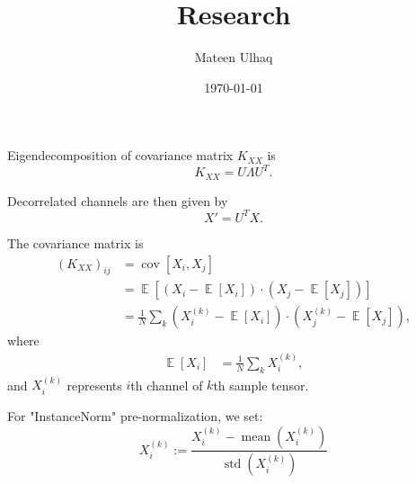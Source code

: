 \documentclass[12pt]{extarticle}
\title{Research}
\author{Mateen Ulhaq}
\date{\today}
\DeclareMathOperator{\cov}{cov}
\DeclareMathOperator{\EV}{\mathbb{E}}
\DeclareMathOperator{\mean}{mean}
\DeclareMathOperator{\std}{std}
\begin{document}
\maketitle

Eigendecomposition of covariance matrix $K_{XX}$ is
\[ K_{XX} = U \Lambda U^T. \]

Decorrelated channels are then given by
\[ X' = U^T X. \]


\bigskip

%

The covariance matrix is
\begin{align*}
  {(K_{XX})}_{ij}
    &= \cov[X_i, X_j] \\
    &= \EV[(X_i - \EV[X_i]) \cdot (X_j - \EV[X_j])] \\
    &= \frac{1}{N} \sum_k {(X_i^{(k)} - \EV[X_i]) \cdot (X_j^{(k)} - \EV[X_j])},
\end{align*}
where
\begin{align*}
  \EV[X_i]
    &= \frac{1}{N} \sum_k X_i^{(k)},
\end{align*}
and $X_i^{(k)}$ represents $i$th channel of $k$th sample tensor.

\bigskip

For "InstanceNorm" pre-normalization, we set:
\[ X_i^{(k)} := \frac{X_i^{(k)} - \mean(X_i^{(k)})}{\std(X_i^{(k)})} \]
\end{document}
